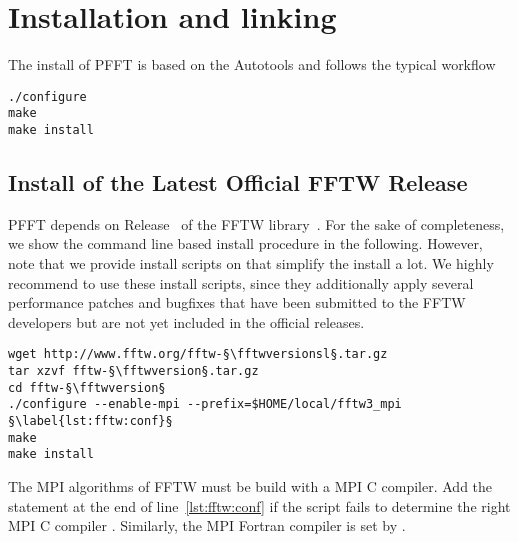 \chapter{Installation and linking}\label{chap:inst}

The install of PFFT is based on the Autotools and follows the typical workflow
\begin{lstlisting}[escapechar=§]
./configure
make
make install
\end{lstlisting}


\section{Install of the Latest Official FFTW Release}\label{sec:fftw_inst}
PFFT depends on Release~\fftwversion{} of the FFTW library~\cite{fftw}.
For the sake of completeness, we show the command line based install procedure in the following.
However, note that we provide install scripts on \websoft that simplify the install a lot.
We highly recommend to use these install scripts, since they additionally apply several
performance patches and bugfixes that have been submitted to the FFTW developers but
are not yet included in the official releases.
\begin{lstlisting}[escapechar=§]
wget http://www.fftw.org/fftw-§\fftwversionsl§.tar.gz
tar xzvf fftw-§\fftwversion§.tar.gz
cd fftw-§\fftwversion§
./configure --enable-mpi --prefix=$HOME/local/fftw3_mpi §\label{lst:fftw:conf}§
make
make install
\end{lstlisting}
The MPI algorithms of FFTW must be build with a MPI C compiler. Add the statement 
at the end of line~\ref{lst:fftw:conf} if the  script fails to determine the right
MPI C compiler . Similarly, the MPI Fortran compiler  is set by .

